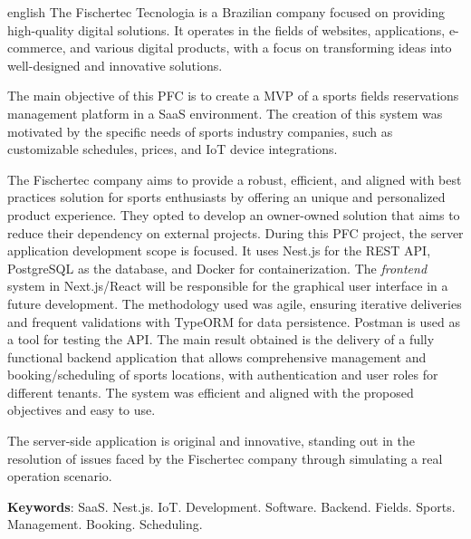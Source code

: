 		

\begin{resumo}[Abstract]
	\SingleSpacing
	\begin{otherlanguage*}{english}
		The Fischertec Tecnologia is a Brazilian company focused on providing high-quality digital solutions. It operates in the fields of websites, applications, e-commerce, and various digital products, with a focus on transforming ideas into well-designed and innovative solutions.

		The main objective of this PFC is to create a \acrfull{MVP} of a sports fields reservations management platform in a \acrfull{SaaS} environment. The creation of this system was motivated by the specific needs of sports industry companies, such as customizable schedules, prices, and IoT device integrations.

		The Fischertec company aims to provide a robust, efficient, and aligned with best practices solution for sports enthusiasts by offering an unique and personalized product experience. They opted to develop an owner-owned solution that aims to reduce their dependency on external projects.
		During this PFC project, the server application development scope is focused. It uses Nest.js for the \acrshort{REST} \acrshort{API}, PostgreSQL as the database, and Docker for containerization. The \textit{frontend} system in Next.js/React will be responsible for the graphical user interface in a future development.
		The methodology used was agile, ensuring iterative deliveries and frequent validations with TypeORM for data persistence. Postman is used as a tool for testing the \acrshort{API}.
		The main result obtained is the delivery of a fully functional backend application that allows comprehensive management and booking/scheduling of sports locations, with authentication and user roles for different tenants. The system was efficient and aligned with the proposed objectives and easy to use.

		The server-side application is original and innovative, standing out in the resolution of issues faced by the Fischertec company through simulating a real operation scenario.
		
		\textbf{Keywords}: \acrshort{SaaS}. Nest.js. \acrshort{IoT}. Development. Software. Backend. Fields. Sports. Management. Booking. Scheduling.
	\end{otherlanguage*}
\end{resumo}

